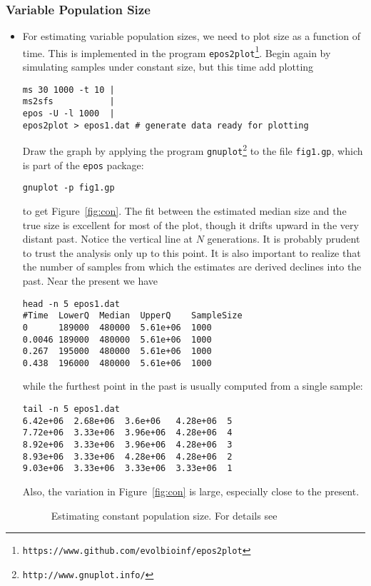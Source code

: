 \documentclass[a4paper, english]{article}
\newcommand{\ty}{\texttt}
\begin{document}
\subsubsection{Variable Population Size}
\begin{itemize}
  \item For estimating variable population sizes, we need to
    plot size as a function of time. This is implemented in the
    program \ty{epos2plot}\footnote{\ty{https://www.github.com/evolbioinf/epos2plot}}. Begin again by simulating samples under constant 
    size, but this time add plotting
\begin{verbatim}
ms 30 1000 -t 10 | 
ms2sfs           | 
epos -U -l 1000  | 
epos2plot > epos1.dat # generate data ready for plotting
\end{verbatim}
Draw the graph by applying the program
\ty{gnuplot}\footnote{\ty{http://www.gnuplot.info/}} to the file
\ty{fig1.gp}, which is part of the \ty{epos} package:
\begin{verbatim}
gnuplot -p fig1.gp
\end{verbatim}
to get Figure~\ref{fig:con}. The fit between the estimated median size
and the true size is excellent for most of the plot, though it drifts
upward in the very distant past. Notice the vertical line at $N$
generations. It is probably prudent to trust the analysis only up to
this point. It is also important to realize that the number
of samples from which the estimates are derived declines into the
past. Near the present we have
\begin{verbatim}
head -n 5 epos1.dat 
#Time  LowerQ  Median  UpperQ    SampleSize
0      189000  480000  5.61e+06  1000
0.0046 189000  480000  5.61e+06  1000
0.267  195000  480000  5.61e+06  1000
0.438  196000  480000  5.61e+06  1000
\end{verbatim}        
while the furthest point in the past is usually computed from a single
sample:
\begin{verbatim}
tail -n 5 epos1.dat 
6.42e+06  2.68e+06  3.6e+06   4.28e+06  5
7.72e+06  3.33e+06  3.96e+06  4.28e+06  4
8.92e+06  3.33e+06  3.96e+06  4.28e+06  3
8.93e+06  3.33e+06  4.28e+06  4.28e+06  2
9.03e+06  3.33e+06  3.33e+06  3.33e+06  1
\end{verbatim}
Also, the variation in Figure~\ref{fig:con} is
large, especially close to the present.
\begin{figure}
  \begin{center}
    \scalebox{0.6}{}
  \end{center}
  \caption{Estimating constant population size. For details see
}
\end{figure}
\end{itemize}
\end{document}
